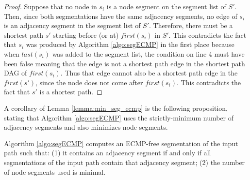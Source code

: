 \begin{proof}
Suppose that no node in $s_i$ is a node segment on the segment list of $S'$. Then, since both segmentations have the same adjacency
segments, no edge of $s_i$ is an adjacency segment in the segment list of $S'$. Therefore,
there must be a shortest path $s'$ starting before (or at) $\textit{first}(s_i)$ in $S'$. This contradicts the fact that
$s_i$ was produced by Algorithm \ref{algo:segECMP} in the first place because when $\textit{last}(s_i)$ was added to the segment list,
the condition on line 4 must have been false meaning that the edge is not a shortest path edge in the shortest path DAG of $\textit{first}(s_i)$. Thus  that edge
cannot also be  a shortest
path edge in the $\textit{first}(s')$, since the node does not come after $\textit{first}(s_i)$. This contradicts the fact that $s'$ is a shortest path.
% 
\end{proof}

A corollary of Lemma \ref{lemma:min_seg_ecmp} is the following proposition,
stating that Algorithm \ref{algo:segECMP} uses the strictly-minimum number of
adjacency segments and also minimizes node segments.

\begin{proposition}
Algorithm \ref{algo:segECMP} computes an ECMP-free segmentation of the input path such that: (1) it contains an adjacency segment if 
and only if all segmentations of the input path contain that adjacency segment; (2) the number of node segments used is minimal.
\end{proposition}

